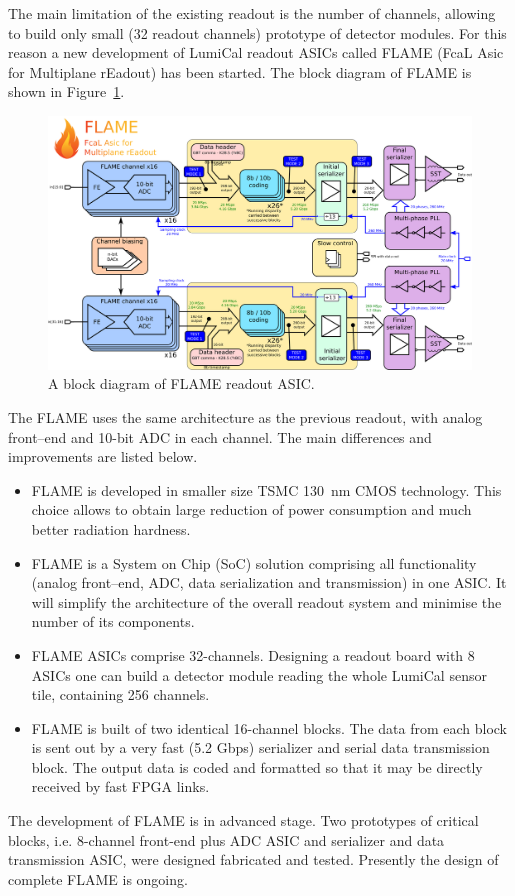 The main limitation of the existing readout is the number of channels, allowing to build only
small (32 readout channels)  prototype of detector modules. For this reason a new
development of LumiCal readout ASICs called FLAME (FcaL Asic for Multiplane rEadout)
has been started. The block diagram of FLAME is shown in Figure~\ref{fig:FLAME}. 
\begin{figure}[hbp]
\begin{center}
    \includegraphics[width=0.9\columnwidth]{Calorimeter/FCAL/figs/FLAME}
  \end{center}
          \caption{A block diagram of FLAME readout ASIC.}
    \label{fig:FLAME}
\end{figure}
The FLAME uses the same architecture as the previous readout, with analog front--end and 10-bit ADC in each channel.
The main differences and improvements are listed below. 
\begin{itemize}
\item{FLAME is developed in smaller size TSMC 130~nm CMOS technology.
 This choice allows to obtain large reduction of power consumption and much better radiation hardness}.
\item{FLAME is a System on Chip (SoC) solution comprising all functionality
  (analog front--end, ADC, data serialization and transmission) in one ASIC.
  It will simplify the architecture of the overall readout system and minimise the number of its components.}
\item{FLAME ASICs comprise 32-channels. Designing a readout board with 8 ASICs one can build a detector module
  reading the whole LumiCal sensor tile, containing 256 channels. }
\item{FLAME is built of two identical 16-channel blocks. The data from each block is sent out
  by a very fast (5.2 {Gbps}) serializer and serial data transmission block. The output data is coded and formatted so that it may be directly received by fast FPGA links.}
\end{itemize}
The development of FLAME is in advanced stage. Two prototypes of critical blocks, i.e. 8-channel front-end plus ADC
ASIC and serializer and data transmission ASIC, were designed fabricated and tested. Presently the design of complete FLAME
is ongoing.

